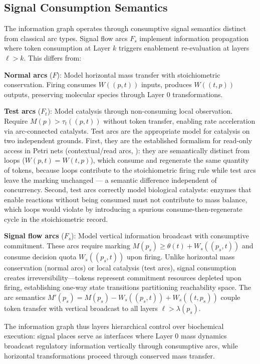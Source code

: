 \documentclass[10pt,letterpaper]{article}
\begin{document}
\subsection{Signal Consumption Semantics}

The information graph operates through consumptive signal semantics distinct from classical arc types. Signal flow arcs $F_s$ implement information propagation where token consumption at Layer $k$ triggers enablement re-evaluation at layers $\ell > k$. This differs from:

\textbf{Normal arcs} ($F$): Model horizontal mass transfer with stoichiometric conservation. Firing consumes $W((p,t))$ inputs, produces $W((t,p))$ outputs, preserving molecular species through Layer 0 transformations.

\textbf{Test arcs} ($F_t$): Model catalysis through non-consuming local observation. Require $M(p) > \tau_t((p,t))$ without token transfer, enabling rate acceleration via arc-connected catalysts.
Test arcs are the appropriate model for catalysis on two independent grounds.
First, they are the established formalism for read-only access in Petri nets (contextual/read arcs, \cite{baldan2001}): they are semantically distinct from loops ($W(p,t)=W(t,p)$), which consume and regenerate the same quantity of tokens, because loops contribute to the stoichiometric firing rule while test arcs leave the marking unchanged --- a semantic difference independent of concurrency.
Second, test arcs correctly model biological catalysts: enzymes that enable reactions without being consumed must not contribute to mass balance, which loops would violate by introducing a spurious consume-then-regenerate cycle in the stoichiometric record.

\textbf{Signal flow arcs} ($F_s$): Model vertical information broadcast with consumptive commitment. These arcs require marking
$M(p_s) \geq \theta(t) + W_s((p_s,t))$
and consume decision quota $W_s((p_s,t))$ upon firing. Unlike horizontal mass conservation (normal arcs) or local catalysis (test arcs), signal consumption creates irreversibility---tokens represent commitment resources depleted upon firing, establishing one-way state transitions partitioning reachability space. The arc semantics
$M'(p_s) = M(p_s) - W_s((p_s,t)) + W_s((t,p_s))$
couple token transfer with vertical broadcast to all layers $\ell > \lambda(p_s)$.

The information graph thus layers hierarchical control over biochemical execution: signal places serve as interfaces where Layer 0 mass dynamics broadcast regulatory information vertically through consumptive arcs, while horizontal transformations proceed through conserved mass transfer.
\end{document}
